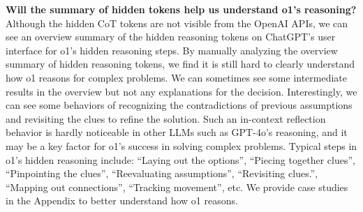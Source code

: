 \textbf{Will the summary of hidden tokens help us understand o1's reasoning?}
Although the hidden CoT tokens are not visible from the OpenAI APIs, we can see an overview summary of the hidden reasoning tokens on ChatGPT's user interface for o1's hidden reasoning steps.
By manually analyzing the overview summary of hidden reasoning tokens, we find it is still hard to clearly understand how o1 reasons for complex problems.
We can sometimes see some intermediate results in the overview but not any explanations for the decision.
Interestingly, we can see some behaviors of recognizing the contradictions of previous assumptions and revisiting the clues to refine the solution.
Such an in-context reflection behavior is hardly noticeable in other LLMs such as GPT-4o's reasoning, and it may be a key factor for o1's success in solving complex problems.
Typical steps in o1's hidden reasoning include: ``Laying out the options'', ``Piecing together clues'', ``Pinpointing the clues'', ``Reevaluating assumptions'', ``Revisiting clues.'', ``Mapping out connections'', ``Tracking movement'', etc.
We provide case studies in the Appendix to better understand how o1 reasons. 




